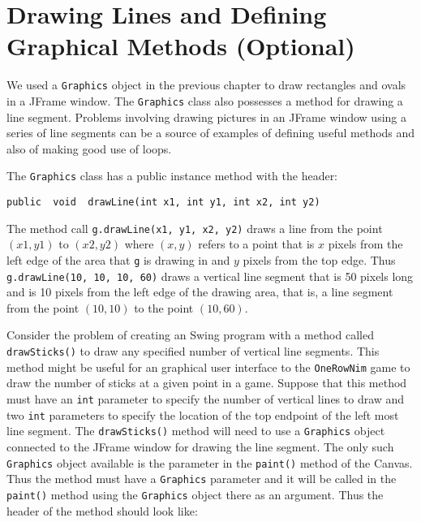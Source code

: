 \section{Drawing Lines and Defining Graphical Methods (Optional)}
\label{drawing-linesand-defining-graphical-methods-optional}

We used a  {\tt Graphics} object in the previous chapter to draw
rectangles and ovals in a JFrame window. The {\tt Graphics} class
also possesses a method for drawing a line segment. 
Problems involving drawing pictures in an JFrame window using a 
series of line segments can be a source of examples of defining 
useful methods and also of making good use of loops.

The {\tt Graphics} class has a public instance method with
the header:

\begin{jjjlisting}
\begin{lstlisting}
public  void  drawLine(int x1, int y1, int x2, int y2)
\end{lstlisting}
\end{jjjlisting}

\noindent The method call  {\tt g.drawLine(x1, y1, x2, y2)}
draws a line from the point $(x1,y1)$ to $(x2,y2)$ where $(x,y)$
refers to a point that is $x$ pixels from the left edge of
the area that {\tt g} is drawing in and $y$ pixels from the
top edge.  Thus {\tt g.drawLine(10, 10, 10, 60)} draws a
vertical line segment that is 50 pixels long and is 10 pixels
from the left edge of the drawing area, that is, a line
segment from the point $(10,10)$ to the point $(10,60)$.

Consider the problem of creating an Swing program with a
method called {\tt drawSticks()} to draw any specified 
number of vertical line segments.
This method might be useful for an graphical user interface
to the {\tt OneRowNim} game to draw the number of sticks 
at a given point in a game.  Suppose that this method must have an
{\tt int} parameter to specify the number of vertical lines to draw
and two {\tt int} parameters to specify the location of
the top endpoint of the left most line segment.  The  {\tt drawSticks()}
method will need to use a {\tt Graphics} object connected to the
JFrame window for drawing the line segment.  The only such 
{\tt Graphics} object available is the parameter in  the {\tt paint()}
method of the Canvas.  Thus the method must have a {\tt Graphics}
parameter and it will be called in the {\tt paint()} method
using the {\tt Graphics} object there
as an argument. Thus the header of the method should look like:

